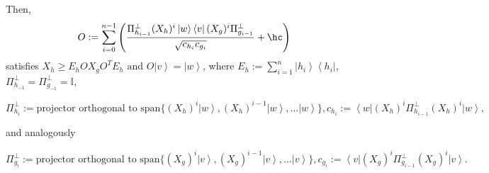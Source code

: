 \documentclass{article}
\begin{document}
\begin{proposition}
\begin{itemize}
  \end{itemize}
  Then,
  \begin{displaymath}
    O:=\sum_{i=0}^{n-1}\left(\frac{\Pi_{h_{i-1}}^{\perp}(X_{h})^{i}\left|w\right\rangle \left\langle v\right|(X_{g})^{i}\Pi_{g_{i-1}}^{\perp}}{\sqrt{c_{h_{i}}c_{g_{i}}}}+\hc\right)
  \end{displaymath}
  satisfies
  $
    X_{h}\ge E_{h}OX_{g}O^{T}E_{h}\text{ and }O\left|v\right\rangle =\left|w\right\rangle
  $, where $E_{h}:=\sum_{i=1}^{n}\left|h_{i}\right\rangle \left\langle h_{i}\right|$,
  $\Pi_{h_{-1}}^{\perp}=\Pi_{g_{-1}}^{\perp}=\mathbb{I}$,
  \begin{footnotesize}
    \begin{displaymath}\Pi_{h_{i}}^{\perp}:=\text{projector orthogonal to }\text{span}\{(X_{h})^{i}\left|w\right\rangle ,(X_{h})^{i-1}\left|w\right\rangle ,\dots\left|w\right\rangle \},
      c_{h_{i}}:=\left\langle w\right|(X_{h})^{i}\Pi_{h_{i-1}}^{\perp}(X_{h})^{i}\left|w\right\rangle,\end{displaymath}
  \end{footnotesize}
  and analogously
  \begin{footnotesize}
    \begin{displaymath}
      \Pi_{g_{i}}^{\perp}:=\text{projector orthogonal to }\text{span}\{(X_{g})^{i}\left|v\right\rangle ,(X_{g})^{i-1}\left|v\right\rangle ,\dots\left|v\right\rangle \},
      c_{g_{i}}:=\left\langle v\right|(X_{g})^{i}\Pi_{g_{i-1}}^{\perp}(X_{g})^{i}\left|v\right\rangle. \end{displaymath}
  \end{footnotesize}

\end{proposition}
\end{document}
